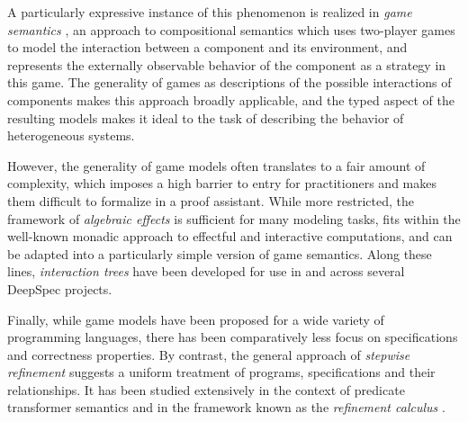 \documentclass[draft,11pt]{report}
\begin{document}
A particularly expressive instance of this phenomenon
is realized in \emph{game semantics} \cite{cspgs},
an approach to compositional semantics
which uses two-player games to model
the interaction between a component and its environment,
and represents the externally observable behavior
of the component as a strategy in this game.
The generality of games as
descriptions of the possible interactions of components
makes this approach broadly applicable,
and the typed aspect of the resulting models
makes it ideal to the task of
describing the behavior of heterogeneous systems.

However,
the generality of game models
often translates to a fair amount of complexity,
which imposes a high barrier to entry for practitioners
and makes them difficult to formalize in a proof assistant.
While more restricted,
the framework of \emph{algebraic effects} \cite{effadq}
is sufficient for many modeling tasks,
fits within the well-known monadic approach
to effectful and interactive computations,
and can be adapted into a particularly simple version
of game semantics.
Along these lines,
\emph{interaction trees} \cite{itree}
have been developed for use in and across
several DeepSpec projects.


Finally,
while game models have been proposed
for a wide variety of programming languages,
there has been comparatively less focus
on specifications and correctness properties.
By contrast,
the general approach of \emph{stepwise refinement}
suggests a uniform treatment of programs, specifications
and their relationships.
It has been studied extensively in the context of
predicate transformer semantics \cite{gc}
and in the framework known as the \emph{refinement calculus} \cite{refcal}.
\end{document}
